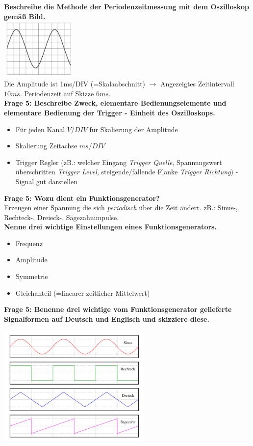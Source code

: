 \documentclass[11pt,a4paper]{scrartcl}
\begin{document}
\textbf{Beschreibe die Methode der Periodenzeitmessung mit dem Oszilloskop gemäß Bild.}\\
\includegraphics[height=3cm,keepaspectratio]{Oszi.png}\\
Die Amplitude ist 1ms/DIV (=Skalaabschnitt) $\rightarrow$ Angezeigtes Zeitintervall $10ms$. Periodenzeit auf Skizze $6ms$.\\
\textbf{Frage 5: Beschreibe Zweck, elementare Bedienungselemente und elementare Bedienung der Trigger - Einheit des Oszilloskops.}
\begin{itemize}
	\item Für jeden Kanal $V/DIV$ für Skalierung der Amplitude
	\item Skalierung Zeitachse $ms/DIV$
	\item Trigger Regler (zB.: welcher Eingang \emph{Trigger Quelle}, Spannungswert überschritten \emph{Trigger Level}, steigende/fallende Flanke \emph{Trigger Richtung}) - Signal gut darstellen
\end{itemize}
\textbf{Frage 5: Wozu dient ein Funktionsgenerator?}\\
Erzeugen einer Spannung die sich \textit{periodisch} über die Zeit ändert. zB.: Sinus-, Rechteck-, Dreieck-, Sägezahnimpulse.\\
\textbf{Nenne drei wichtige Einstellungen eines Funktionsgenerators.}
\begin{itemize}
	\item Frequenz
	\item Amplitude
	\item Symmetrie
	\item Gleichanteil (=linearer zeitlicher Mittelwert)
\end{itemize}
\textbf{Frage 5: Benenne drei wichtige vom Funktionsgenerator gelieferte Signalformen auf Deutsch und Englisch und skizziere diese.}\\
		\begin{minipage}{0.49\linewidth} 
      \includegraphics[height=6cm,keepaspectratio]{Funktionsgenerator_Wellenformen.png}
    \end{minipage} 
\end{document}
